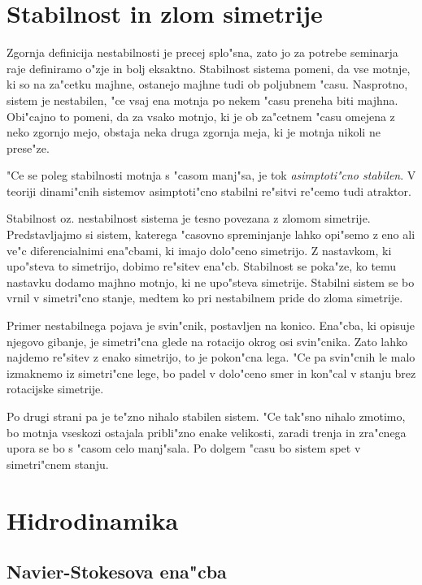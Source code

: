 \documentclass[a4paper,12pt]{article}
\begin{document}
\section{Stabilnost in zlom simetrije}

Zgornja definicija nestabilnosti je precej splo"sna, zato jo za potrebe seminarja raje definiramo o"zje in bolj eksaktno. Stabilnost sistema pomeni, da vse motnje, ki so na za"cetku majhne, ostanejo majhne tudi ob poljubnem "casu. Nasprotno, sistem je nestabilen, "ce vsaj ena motnja po nekem "casu preneha biti majhna. Obi"cajno to pomeni, da za vsako motnjo, ki je ob za"cetnem "casu omejena z neko zgornjo mejo, obstaja neka druga zgornja meja, ki je motnja nikoli ne prese"ze. 

"Ce se poleg stabilnosti motnja s "casom manj"sa, je tok \emph{asimptoti"cno stabilen}. V teoriji dinami"cnih sistemov asimptoti"cno stabilni re"sitvi re"cemo tudi atraktor. 

Stabilnost oz. nestabilnost sistema je tesno povezana z zlomom simetrije. Predstavljajmo si sistem, katerega "casovno spreminjanje lahko opi"semo z eno ali ve"c diferencialnimi ena"cbami, ki imajo dolo"ceno simetrijo. Z nastavkom, ki upo"steva to simetrijo, dobimo re"sitev ena"cb. Stabilnost se poka"ze, ko temu nastavku dodamo majhno motnjo, ki ne upo"steva simetrije. Stabilni sistem se bo vrnil v simetri"cno stanje, medtem ko pri nestabilnem pride do zloma simetrije. 

Primer nestabilnega pojava je svin"cnik, postavljen na konico. Ena"cba, ki opisuje njegovo gibanje, je simetri"cna glede na rotacijo okrog osi svin"cnika. Zato lahko najdemo re"sitev z enako simetrijo, to je pokon"cna lega. "Ce pa svin"cnih le malo izmaknemo iz simetri"cne lege, bo padel v dolo"ceno smer in kon"cal v stanju brez rotacijske simetrije. 

Po drugi strani pa je te"zno nihalo stabilen sistem. "Ce tak"sno nihalo zmotimo, bo motnja vseskozi ostajala pribli"zno enake velikosti, zaradi trenja in zra"cnega upora se bo s "casom celo manj"sala. Po dolgem "casu bo sistem spet v simetri"cnem stanju. 

\section{Hidrodinamika}

\subsection{Navier-Stokesova ena"cba}
\end{document}
